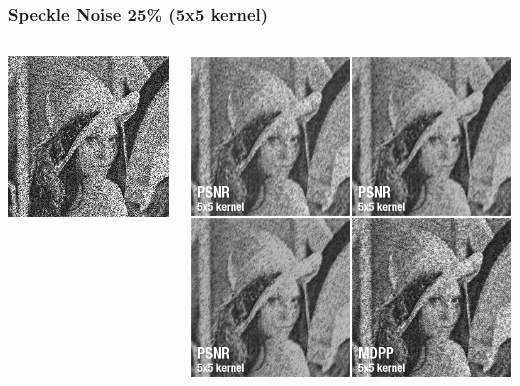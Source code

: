 \documentclass{beamer}
\begin{document}
	
		\begin{frame}[t,fragile]
		\frametitle{Speckle Noise 25\% (5x5 kernel)}
		
		\begin{columns}[onlytextwidth]
			\begin{column}{0.3\textwidth}
				\includegraphics[width=\textwidth]{img/speckle.jpg}				
			\end{column}

			\begin{column}{0.6\textwidth}
				\includegraphics[width=\textwidth]{img/best25_speckle.jpg}
			\end{column}
		\end{columns}
			
	\end{frame}	
	
	
\end{document}
